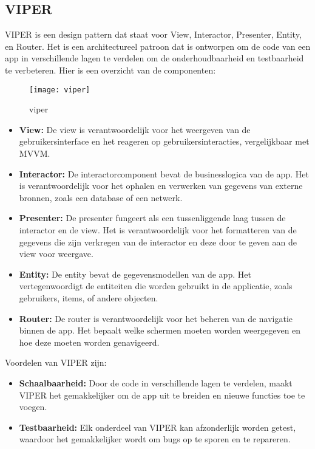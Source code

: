 \subsection{VIPER}
\autocite{MediumVIPER} VIPER is een design pattern dat staat voor View, Interactor, Presenter, Entity, en Router. Het is een architectureel patroon dat is ontworpen om de code van een app in verschillende lagen te verdelen om de onderhoudbaarheid en testbaarheid te verbeteren. Hier is een overzicht van de componenten:
\begin{figure}[H]
    \centering
    \texttt{[image: viper]} 
    \caption{viper \autocite{ViperImage}}
    \label{fig:viper}
\end{figure}

\begin{itemize}
    \item {\textbf{View:} De view is verantwoordelijk voor het weergeven van de gebruikersinterface en het reageren op gebruikersinteracties, vergelijkbaar met MVVM.}
    \item {\textbf{Interactor:} De interactorcomponent bevat de businesslogica van de app. Het is verantwoordelijk voor het ophalen en verwerken van gegevens van externe bronnen, zoals een database of een netwerk.}
    \item {\textbf{Presenter:} De presenter fungeert als een tussenliggende laag tussen de interactor en de view. Het is verantwoordelijk voor het formatteren van de gegevens die zijn verkregen van de interactor en deze door te geven aan de view voor weergave.}
    \item {\textbf{Entity:} De entity bevat de gegevensmodellen van de app. Het vertegenwoordigt de entiteiten die worden gebruikt in de applicatie, zoals gebruikers, items, of andere objecten.}
    \item {\textbf{Router:} De router is verantwoordelijk voor het beheren van de navigatie binnen de app. Het bepaalt welke schermen moeten worden weergegeven en hoe deze moeten worden genavigeerd.}
\end{itemize}
Voordelen van VIPER zijn:
\begin{itemize}
    \item {\textbf{Schaalbaarheid:} Door de code in verschillende lagen te verdelen, maakt VIPER het gemakkelijker om de app uit te breiden en nieuwe functies toe te voegen.}
    \item {\textbf{Testbaarheid:} Elk onderdeel van VIPER kan afzonderlijk worden getest, waardoor het gemakkelijker wordt om bugs op te sporen en te repareren.}
\end{itemize}

